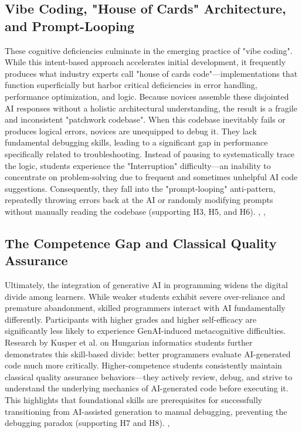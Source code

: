 \documentclass[../main.tex]{subfiles}
\begin{document}
\subsection{Vibe Coding, "House of Cards" Architecture, and Prompt-Looping}
These cognitive deficiencies culminate in the emerging practice of "vibe coding". While this intent-based approach accelerates initial development, it frequently produces what industry experts call "house of cards code"—implementations that function superficially but harbor critical deficiencies in error handling, performance optimization, and logic.
Because novices assemble these disjointed AI responses without a holistic architectural understanding, the result is a fragile and inconsistent "patchwork codebase".
When this codebase inevitably fails or produces logical errors, novices are unequipped to debug it. They lack fundamental debugging skills, leading to a significant gap in performance specifically related to troubleshooting.
Instead of pausing to systematically trace the logic, students experience the "Interruption" difficulty—an inability to concentrate on problem-solving due to frequent and sometimes unhelpful AI code suggestions.
Consequently, they fall into the "prompt-looping" anti-pattern, repeatedly throwing errors back at the AI or randomly modifying prompts without manually reading the codebase (supporting H3, H5, and H6).
\cite{maes2025gotchas}, \cite{shen2026how}, \cite{prather2024widening}

\subsection{The Competence Gap and Classical Quality Assurance}
Ultimately, the integration of generative AI in programming widens the digital divide among learners.
While weaker students exhibit severe over-reliance and premature abandonment, skilled programmers interact with AI fundamentally differently. Participants with higher grades and higher self-efficacy are significantly less likely to experience GenAI-induced metacognitive difficulties.
Research by Kusper et al. on Hungarian informatics students further demonstrates this skill-based divide: better programmers evaluate AI-generated code much more critically.
Higher-competence students consistently maintain classical quality assurance behaviors—they actively review, debug, and strive to understand the underlying mechanics of AI-generated code before executing it.
This highlights that foundational skills are prerequisites for successfully transitioning from AI-assisted generation to manual debugging, preventing the debugging paradox (supporting H7 and H8).
\cite{prather2024widening}, \cite{kusper2025we}
\end{document}
